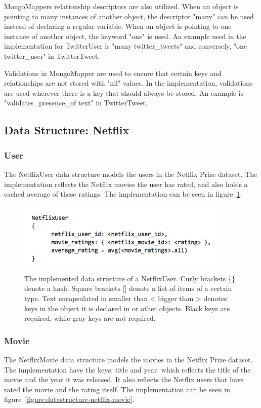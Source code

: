 MongoMappers relationship descriptors are also utilized. When an object is pointing to many instances of another object, the descriptor "many" can be used instead of declaring a regular variable. When an object is pointing to one instance of another object, the keyword "one" is used. An example used in the implementation for TwitterUser is "many twitter\_tweets" and conversely, "one twitter\_user" in TwitterTweet.

Validations in MongoMapper are used to ensure that certain keys and relationships are not stored with "nil" values. In the implementation, validations are used wherever there is a key that should always be stored. An example is "validates\_presence\_of text" in TwitterTweet.


\subsection{Data Structure: Netflix}

\subsubsection{User}
The NetflixUser data structure models the users in the Netflix Prize dataset. The implementation reflects the Netflix movies the user has rated, and also holds a cached average of these ratings. The implementation can be seen in figure~\ref{figure:datastructure-netflix-user}.

	\begin{figure}[H]
	\includegraphics[width=4in]{image/datastructure-netflix-user.png}
	\centering
	\caption[Data structure of a NetflixUser]{The implemented data structure of a NetflixUser. Curly brackets \{\} denote a hash. Square brackets [] denote a list of items of a certain type. Text encapsulated in smaller than < bigger than > denotes keys in the object it is declared in or other objects. Black keys are required, while gray keys are not required.}
	\label{figure:datastructure-netflix-user}
	\end{figure}

\subsubsection{Movie}
The NetflixMovie data structure models the movies in the Netflix Prize dataset. The implementation have the keys: title and year, which reflects the title of the movie and the year it was released. It also reflects the Netflix users that have rated the movie and the rating itself. The implementation can be seen in figure~\ref{figure:datastructure-netflix-movie}.

